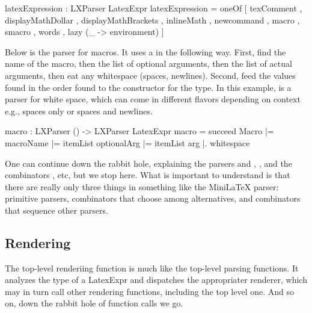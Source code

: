 \begin{listing}
latexExpression : LXParser LatexExpr
latexExpression =
    oneOf
        [ texComment
        , displayMathDollar
        , displayMathBrackets
        , inlineMath
        , newcommand
        , macro
        , smacro
        , words
        , lazy (\_ -> environment)
        ]
\end{listing}

Below is the parser for macros.  It uses a  in the following way.   First, find the name of the macro, then the list of optional arguments, then the list of  actual arguments, then eat any whitespace (spaces, newlines).  Second, feed the values found in the order found to the constructor  for the  type.  In this example,  is a parser for white space, which can come in different flavors depending on context e.g., spaces only or spaces and newlines.

\begin{listing}
macro : LXParser () -> LXParser LatexExpr
macro =
    succeed Macro
        |= macroName
        |= itemList optionalArg
        |= itemList arg
        |. whitespace
\end{listing}

One can continue down the rabbit hole, explaining the parsers and , ,   and the combinators , etc, but we stop here.  What is important to understand is that there are really only three things in something like the MiniLaTeX parser: primitive parsers, combinators that choose among alternatives, and combinators that sequence other parsers.

\subsection{Rendering}


The top-level renderiing function is much like the top-level parsing functions. It analyzes the type of a LatexExpr and dispatches the appropriater renderer, which may in turn call other rendering functions, including the top level one. And so on, down the rabbit hole of function calls we go.


